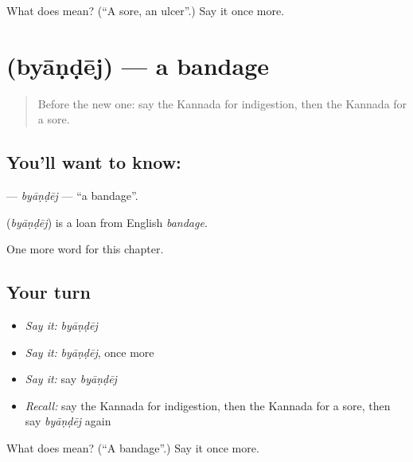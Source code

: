 \begin{tcolorbox}[breakable,colback=teal!4,colframe=teal!35!black,title={Before you move on}]
What does  mean? (\textquotedblleft{}A sore, an ulcer\textquotedblright{}.) Say it once more.
\end{tcolorbox}
\section[\texorpdfstring{\kn{ಬ್ಯಾಂಡೇಜ್} (byāṇḍēj)}{ಬ್ಯಾಂಡೇಜ್ (byāṇḍēj)}]{ (byāṇḍēj) — a bandage}

\label{lesson:KA-C246-byandej}



\begin{quote}
Before the new one: say the Kannada for indigestion, then the Kannada for a sore.
\end{quote}

\subsection*{You'll want to know: }
\textbf{} — \emph{byāṇḍēj} — \textquotedblleft{}a bandage\textquotedblright{}.

\begin{cousinweb}
\textbf{} (\emph{byāṇḍēj}) is a loan from English \emph{bandage}.
\end{cousinweb}

\begin{grammarlens}[title={What you've built}]
One more word for this chapter.
\end{grammarlens}

\subsection*{Your turn}
\begin{itemize}
\raggedright
  \item \emph{Say it:} \emph{byāṇḍēj}
  \item \emph{Say it:} \emph{byāṇḍēj}, once more
  \item \emph{Say it:} say \emph{byāṇḍēj}
  \item \emph{Recall:} say the Kannada for indigestion, then the Kannada for a sore, then say \emph{byāṇḍēj} again
\end{itemize}

\begin{tcolorbox}[breakable,colback=teal!4,colframe=teal!35!black,title={Before you move on}]
What does  mean? (\textquotedblleft{}A bandage\textquotedblright{}.) Say it once more.
\end{tcolorbox}
